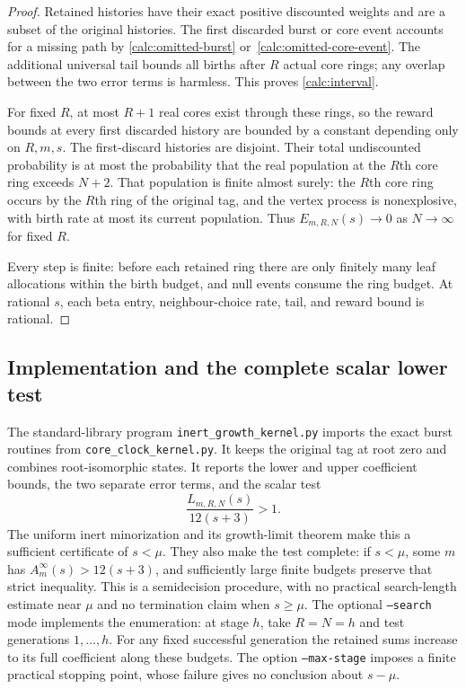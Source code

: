 \begin{proof}
Retained histories have their exact positive discounted weights and
are a subset of the original histories. The first discarded burst or
core event accounts for a missing path by
\eqref{calc:omitted-burst} or~\eqref{calc:omitted-core-event}. The additional
universal tail bounds all births after $R$ actual core rings; any
overlap between the two error terms is harmless. This proves
\eqref{calc:interval}.

For fixed $R$, at most $R+1$ real cores exist through these rings, so
the reward bounds at every first discarded history are bounded by a
constant depending only on $R,m,s$. The first-discard histories are
disjoint. Their total undiscounted probability is at most the
probability that the real population at the $R$th core ring exceeds
$N+2$. That population is finite almost surely: the $R$th core ring
occurs by the $R$th ring of the original tag, and the vertex process
is nonexplosive, with birth rate at most its current population.
Thus $E_{m,R,N}(s)\to0$ as $N\to\infty$ for fixed $R$.

Every step is finite: before each retained ring there are only
finitely many leaf allocations within the birth budget, and null
events consume the ring budget. At rational $s$, each beta entry,
neighbour-choice rate, tail, and reward bound is rational.
\end{proof}

\subsection{Implementation and the complete scalar lower test}

The standard-library program \texttt{inert\_growth\_kernel.py} imports
the exact burst routines from \texttt{core\_clock\_kernel.py}. It keeps
the original tag at root zero and combines root-isomorphic states.
It reports the lower and upper coefficient bounds, the two separate
error terms, and the scalar test
\begin{equation}\label{calc:scalar-test}
 \frac{L_{m,R,N}(s)}{12(s+3)}>1.
\end{equation}
The uniform inert minorization and its growth-limit theorem make this
a sufficient certificate of $s<\mu$. They also make the test complete:
if $s<\mu$, some $m$ has $A_m^\infty(s)>12(s+3)$, and sufficiently
large finite budgets preserve that strict inequality. This is a
semidecision procedure, with no practical search-length estimate near
$\mu$ and no termination claim when $s\ge\mu$.
The optional \texttt{--search} mode implements the enumeration: at stage
$h$, take $R=N=h$ and test generations $1,\ldots,h$. For any fixed
successful generation the retained sums increase to its full coefficient
along these budgets. The option \texttt{--max-stage} imposes a finite
practical stopping point, whose failure gives no conclusion about $s-\mu$.

